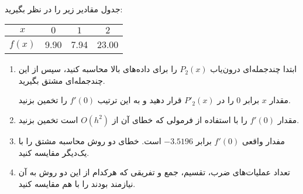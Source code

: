 \\
جدول مقادیر زیر را در نظر بگیرید:

\begin{latin}
\begin{table}[H]
  \begin{center}
    \begin{tabular}{c|c c c}
      \textbf{$x$} & $0$ & $1$ & $2$ \\
      \hline
      \textbf{$f(x)$} & 9.90 & 7.94 & 23.00 \\
    \end{tabular}
  \end{center}
\end{table}
\end{latin}

\begin{enumerate}
	\item
	ابتدا چندجمله‌ای درون‌یاب
	$P_2(x)$
	را برای داده‌های بالا محاسبه کنید،
	سپس از این چندجمله‌ای مشتق بگیرید.
	
	مقدار $x$
	برابر 0
	را در $P'_2(x)$
	قرار دهید و به این ترتیب $f'(0)$
	را تخمین بزنید.
	
	\item
	مقدار
	$f'(0)$
	را با استفاده از فرمولی که خطای آن از
	$O(h^2)$
	است تخمین بزنید.
	
	\item
	مفدار واقعی $f'(0)$
	برابر
	$-3.5196$
	است.
	خطای دو روش محاسبه مشتق را با یک‌دیگر مقایسه کنید.
	
	\item
	تعداد عملیات‌های ضرب، تقسیم، جمع و تفریقی که هرکدام از این دو روش به آن نیازمند بودند را با هم مقایسه کنید.
\end{enumerate}
